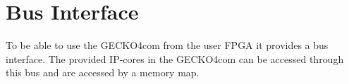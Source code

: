 \chapter{Bus Interface}
To be able to use the {\sc GECKO4com} from the user FPGA it provides a bus
interface. The provided IP-cores in the {\sc GECKO4com} can be accessed through
this bus and are accessed by a memory map.

